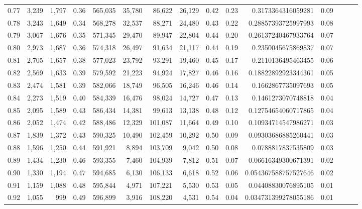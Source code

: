 \begin{tabular}{rrrrrrrrrrrrrrr}
0.77 &   3,239 &  1,797 &  0.36 &  565,035 &   35,780 &   86,622 &   26,129 &  0.42 &  0.23 &     0.3173364316059281 &      0.09 \\
0.78 &   3,243 &  1,649 &  0.34 &  568,278 &   32,537 &   88,271 &   24,480 &  0.43 &  0.22 &    0.28857393725997993 &      0.08 \\
0.79 &   3,067 &  1,676 &  0.35 &  571,345 &   29,470 &   89,947 &   22,804 &  0.44 &  0.20 &    0.26137240467933764 &      0.07 \\
0.80 &   2,973 &  1,687 &  0.36 &  574,318 &   26,497 &   91,634 &   21,117 &  0.44 &  0.19 &     0.2350045675869837 &      0.07 \\
0.81 &   2,705 &  1,657 &  0.38 &  577,023 &   23,792 &   93,291 &   19,460 &  0.45 &  0.17 &     0.2110136495463455 &      0.06 \\
0.82 &   2,569 &  1,633 &  0.39 &  579,592 &   21,223 &   94,924 &   17,827 &  0.46 &  0.16 &    0.18822892923344361 &      0.05 \\
0.83 &   2,474 &  1,581 &  0.39 &  582,066 &   18,749 &   96,505 &   16,246 &  0.46 &  0.14 &     0.1662867735097693 &      0.05 \\
0.84 &   2,273 &  1,519 &  0.40 &  584,339 &   16,476 &   98,024 &   14,727 &  0.47 &  0.13 &     0.1461273070748818 &      0.04 \\
0.85 &   2,095 &  1,589 &  0.43 &  586,434 &   14,381 &   99,613 &   13,138 &  0.48 &  0.12 &    0.12754654060717865 &      0.04 \\
0.86 &   2,052 &  1,474 &  0.42 &  588,486 &   12,329 &  101,087 &   11,664 &  0.49 &  0.10 &    0.10934714547986271 &      0.03 \\
0.87 &   1,839 &  1,372 &  0.43 &  590,325 &   10,490 &  102,459 &   10,292 &  0.50 &  0.09 &    0.09303686885260441 &      0.03 \\
0.88 &   1,596 &  1,250 &  0.44 &  591,921 &    8,894 &  103,709 &    9,042 &  0.50 &  0.08 &     0.0788817837535809 &      0.03 \\
0.89 &   1,434 &  1,230 &  0.46 &  593,355 &    7,460 &  104,939 &    7,812 &  0.51 &  0.07 &    0.06616349300671391 &      0.02 \\
0.90 &   1,330 &  1,194 &  0.47 &  594,685 &    6,130 &  106,133 &    6,618 &  0.52 &  0.06 &   0.054367588757527646 &      0.02 \\
0.91 &   1,159 &  1,088 &  0.48 &  595,844 &    4,971 &  107,221 &    5,530 &  0.53 &  0.05 &    0.04408830076895105 &      0.01 \\
0.92 &   1,055 &    999 &  0.49 &  596,899 &    3,916 &  108,220 &    4,531 &  0.54 &  0.04 &   0.034731399278055186 &      0.01 \\

\end{tabular}
